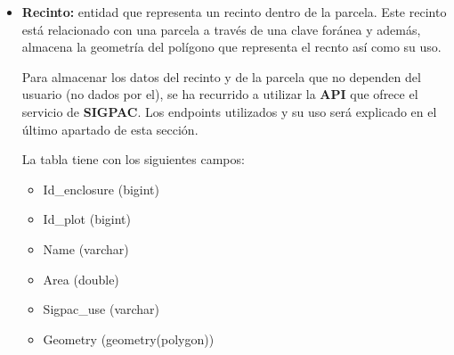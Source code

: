 \begin{itemize}
    El Visor SIGPAC de Andalucía es una aplicación web que permite obtener información gráfica y alfanumérica de las parcelas agrícolas de Andalucía. El Visor ofrece información , a nivel
    de recinto, del año en curso y del anterior. Entre la datos que ofrece destacan: uso del recinto, superficie del recinto, pendiente media, coeficiente de regadío y región (entre otras).

    Los campos de la tabla son los siguientes:

    \begin{itemize}
        \item Id\_plot (bigint)
        \item Province\_code (varchar)
        \item City\_code (varchar)
        \item Polygon\_code (varchar)
        \item Plot\_num (varchar)
        \item Geometry (geometry(polygon))
        \item Land\_register (varchar)
        \item Area (double)
        \item Name (varchar)
        \item City (varchar)
        \item Province (varchar)
        \item Addition\_code (varchar)
        \item Zone\_code (varchar)
    \end{itemize}

    \item \textbf{Recinto:} entidad que representa un recinto dentro de la parcela. Este recinto está relacionado con una parcela a través de una clave foránea y además, almacena la geometría
    del polígono que representa el recnto así como su uso.

    Para almacenar los datos del recinto y de la parcela que no dependen del usuario (no dados por el), se ha recurrido a utilizar la \textbf{API} \cite{apiSgipac} que ofrece el servicio de
    \textbf{SIGPAC}. Los endpoints utilizados y su uso será explicado en el último apartado de esta sección.
    
    La tabla tiene con los siguientes campos:

    \begin{itemize}
        \item Id\_enclosure (bigint)
        \item Id\_plot (bigint)
        \item Name (varchar)
        \item Area (double)
        \item Sigpac\_use (varchar)
        \item Geometry (geometry(polygon))
    \end{itemize}


\end{itemize}
